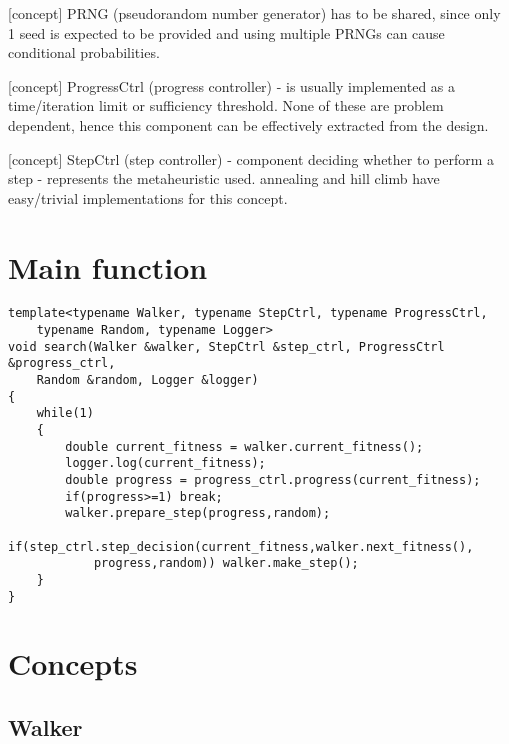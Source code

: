 [concept] PRNG (pseudorandom number generator) has to be shared, since only 1 seed is expected to be provided and using multiple PRNGs can cause conditional probabilities.

[concept] ProgressCtrl (progress controller) - is usually implemented as a time/iteration limit or sufficiency threshold.
None of these are problem dependent, hence this component can be effectively extracted from the design.

[concept] StepCtrl (step controller) - component deciding whether to perform a step - represents the metaheuristic used.
annealing and hill climb have easy/trivial implementations for this concept.

\section{Main function}

\begin{lstlisting}
template<typename Walker, typename StepCtrl, typename ProgressCtrl,
	typename Random, typename Logger>
void search(Walker &walker, StepCtrl &step_ctrl, ProgressCtrl &progress_ctrl,
	Random &random, Logger &logger)
{
	while(1)
	{
		double current_fitness = walker.current_fitness();
		logger.log(current_fitness);
		double progress = progress_ctrl.progress(current_fitness);
		if(progress>=1) break;
		walker.prepare_step(progress,random);
		if(step_ctrl.step_decision(current_fitness,walker.next_fitness(),
			progress,random)) walker.make_step();
	}
}
\end{lstlisting}

\section{Concepts}

\subsection{Walker}

